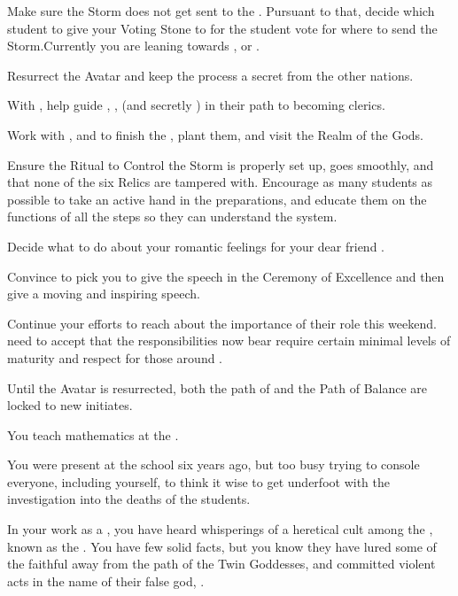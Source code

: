 \documentclass[char]{GL2020}
\begin{document}
\begin{itemz}
    \item Make sure the Storm does not get sent to the \pShip{}. Pursuant to that, decide which student to give your Voting Stone to for the student vote for where to send the Storm.Currently you are leaning towards \cInitiate{}, \cWarlordDaughter{} or \cAmbition{}.
    \item Resurrect the \cEbb{} Avatar and keep the process a secret from the other nations.
    \item With \cEbbPriest{}, help guide \cInitiate{}, \cWarlordDaughter{}, (and secretly \cPirate{}) in their path to becoming clerics.
    \item Work with \cCurse{}, \cAmbition{} and \cAssistantScientist{} to finish the \iBeansMB{}, plant them, and visit the Realm of the Gods.
\end{itemz}

\begin{itemz}
    \item Ensure the Ritual to Control the Storm is properly set up, goes smoothly, and that none of the six Relics are tampered with. Encourage as many students as possible to take an active hand in the preparations, and educate them on the functions of all the steps so they can understand the system.
    \item Decide what to do about your romantic feelings for your dear friend \cMusic{}.
    \item Convince \cMusic{} to pick you to give the speech in the Ceremony of Excellence and then give a moving and inspiring speech.
    \item Continue your efforts to reach \cPirateChild{} about the importance of their role this weekend. \cPirateChild{\They} need\cPirateChild{\verbs} to accept that the responsibilities  now bear\cPirateChild{\verbs} require certain minimal levels of maturity and respect for those around \cPirateChild{\them}.
\end{itemz}

\begin{itemz}[Notes]
    \item Until the \cEbb{} Avatar is resurrected, both the path of \cEbb{} and the Path of Balance are locked to new initiates.
    \item You teach mathematics at the \pSchool{}.
    \item You were present at the school six years ago, but too busy trying to console everyone, including yourself, to think it wise to get underfoot with the investigation into the deaths of the students.
    \item In your work as a \cFlowPriest{\cleric}, you have heard whisperings of a heretical cult among the \pShip{}, known as the \pGoaties{}. You have few solid facts, but you know they have lured some of the faithful away from the path of the Twin Goddesses, and committed violent acts in the name of their false god, \cGenesis{}.
\end{itemz}
\end{document}
